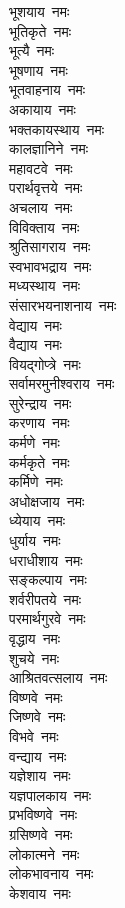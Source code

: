 \begin{multicols}{2}
\begin{flushleft}
भूशयाय~नमः\\
भूतिकृते~नमः\\
भूत्यै~नमः\\
भूषणाय~नमः\\
भूतवाहनाय~नमः\\
अकायाय~नमः\\
भक्तकायस्थाय~नमः\\
कालज्ञानिने~नमः\\
महावटवे~नमः\\
परार्थवृत्तये~नमः\hfill{}\\
अचलाय~नमः\\
विविक्ताय~नमः\\
श्रुतिसागराय~नमः\\
स्वभावभद्राय~नमः\\
मध्यस्थाय~नमः\\
संसारभयनाशनाय~नमः\\
वेद्याय~नमः\\
वैद्याय~नमः\\
वियद्गोप्त्रे~नमः\\
सर्वामरमुनीश्वराय~नमः\hfill{}\\
सुरेन्द्राय~नमः\\
करणाय~नमः\\
कर्मणे~नमः\\
कर्मकृते~नमः\\
कर्मिणे~नमः\\
अधोक्षजाय~नमः\\
ध्येयाय~नमः\\
धुर्याय~नमः\\
धराधीशाय~नमः\\
सङ्कल्पाय~नमः\hfill{}\\
शर्वरीपतये~नमः\\
परमार्थगुरवे~नमः\\
वृद्धाय~नमः\\
शुचये~नमः\\
आश्रितवत्सलाय~नमः\\
विष्णवे~नमः\\
जिष्णवे~नमः\\
विभवे~नमः\\
वन्द्याय~नमः\\
यज्ञेशाय~नमः\hfill{}\\
यज्ञपालकाय~नमः\\
प्रभविष्णवे~नमः\\
ग्रसिष्णवे~नमः\\
लोकात्मने~नमः\\
लोकभावनाय~नमः\\
केशवाय~नमः\\

\end{flushleft}
\end{multicols}
